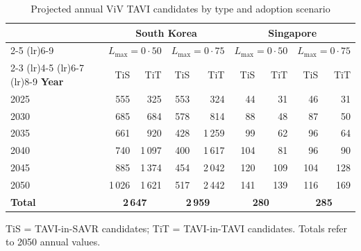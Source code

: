 \documentclass[10pt, a4paper]{article}
\begin{document}
\begin{table}[H]
\centering
\caption{Projected annual ViV TAVI candidates by type and adoption scenario}
\label{tab:viv}
\smallskip
\small
\begin{tabular}{@{}l rrrr rrrr@{}}
\toprule
& \multicolumn{4}{c}{\textbf{South Korea}} & \multicolumn{4}{c}{\textbf{Singapore}} \\
\cmidrule(lr){2-5} \cmidrule(lr){6-9}
& \multicolumn{2}{c}{$L_{\max}=0{\cdot}50$} & \multicolumn{2}{c}{$L_{\max}=0{\cdot}75$} & \multicolumn{2}{c}{$L_{\max}=0{\cdot}50$} & \multicolumn{2}{c}{$L_{\max}=0{\cdot}75$} \\
\cmidrule(lr){2-3} \cmidrule(lr){4-5} \cmidrule(lr){6-7} \cmidrule(lr){8-9}
\textbf{Year} & TiS & TiT & TiS & TiT & TiS & TiT & TiS & TiT \\
\midrule
2025 & 555 & 325 & 553 & 324 & 44 & 31 & 46 & 31 \\
2030 & 685 & 684 & 578 & 814 & 88 & 48 & 87 & 50 \\
2035 & 661 & 920 & 428 & 1\,259 & 99 & 62 & 96 & 64 \\
2040 & 740 & 1\,097 & 400 & 1\,617 & 104 & 81 & 96 & 90 \\
2045 & 885 & 1\,374 & 454 & 2\,042 & 120 & 109 & 104 & 128 \\
2050 & 1\,026 & 1\,621 & 517 & 2\,442 & 141 & 139 & 116 & 169 \\
\midrule
\textbf{Total} & \multicolumn{2}{c}{\textbf{2\,647}} & \multicolumn{2}{c}{\textbf{2\,959}} & \multicolumn{2}{c}{\textbf{280}} & \multicolumn{2}{c}{\textbf{285}} \\
\bottomrule
\end{tabular}

\smallskip
{\footnotesize TiS = TAVI-in-SAVR candidates; TiT = TAVI-in-TAVI candidates. Totals refer to 2050 annual values.}
\end{table}

\end{document}
